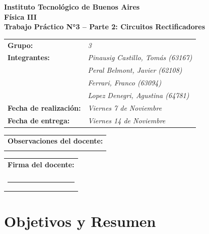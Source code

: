 \documentclass[a4paper,12pt]{article}
\begin{document}
\begin{titlepage}
    \centering
    \vspace*{2cm}
    \textbf{\Large Instituto Tecnológico de Buenos Aires} \\
    \vspace{0.5cm}
    \textbf{\large Física III} \\
    \vspace{1cm}
    \textbf{\LARGE Trabajo Práctico N°3 -- Parte 2: Circuitos Rectificadores} \\
    \vspace{1.5cm}
    \begin{tabular}{ll}
        \textbf{Grupo:} & \textit{3} \\
        \textbf{Integrantes:} & \textit{Pinausig Castillo, Tomás (63167)} \\
                              & \textit{Peral Belmont, Javier (62108)} \\
                              & \textit{Ferrari, Franco (63094)} \\
                              & \textit{Lopez Denegri, Agustina (64781)} \\
        \textbf{Fecha de realización:} & \textit{Viernes 7 de Noviembre} \\
        \textbf{Fecha de entrega:} & \textit{Viernes 14 de Noviembre} \\
    \end{tabular}
    \vspace{2cm}
    \begin{tabular}{|p{12cm}|}
        \hline
        \textbf{Observaciones del docente:} \\
        \vspace{2cm} \\
        \hline
    \end{tabular}
    \vspace{1cm}
    \begin{tabular}{p{6cm}}
        \textbf{Firma del docente:} \\
        \vspace{1cm} \\
        \hrule
    \end{tabular}
\end{titlepage}

\section{Objetivos y Resumen}
\end{document}
